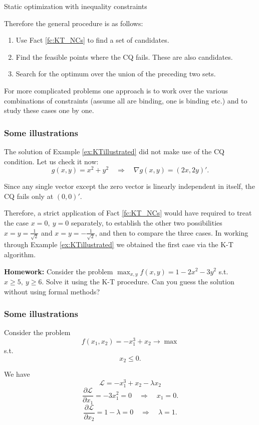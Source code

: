 \documentclass[10pt]{beamer}
\theoremstyle{definition}
\begin{document}
\begin{section}{Static optimization with inequality constraints}
\begin{frame}[fragile]
Therefore the general procedure is as follows:
\begin{enumerate}
\item Use Fact \ref{fc:KT_NCs} to find a set of candidates.
\item Find the feasible points where the CQ fails. These are also candidates.
\item Search for the optimum over the union of the preceding two sets.
\end{enumerate}\bigskip

For more complicated problems one approach is to work over the various combinations of constraints (assume all are binding, one is binding etc.) and to study these cases one by one.
\end{frame}

\begin{frame}[fragile]
\frametitle{Some illustrations}
\begin{example}
The solution of Example \ref{ex:KTillustrated} did not make use of the CQ condition. Let us check it now: \[ g(x,y)=x^2+y^2 \quad \Rightarrow \quad \nabla g(x,y) = (2x,2y)'. \]

Since any single vector except the zero vector is linearly independent in itself, the CQ fails only at $ (0,0)' $.

Therefore, a strict application of Fact \ref{fc:KT_NCs} would have required to treat the case $ x=0,~y=0 $ separately, to establish the other two possibilities $ x=y=\frac{1}{\sqrt{2}} $ and $ x=y=-\frac{1}{\sqrt{2}} $, and then to compare the three cases. In working through Example  \ref{ex:KTillustrated} we obtained the first case via the K-T algorithm.
\label{ex:revisitKTillustrated}
\end{example}\bigskip

\textbf{Homework:} Consider the problem $ \max_{x,y} f(x,y)=1-2x^2-3y^2 $ s.t. $ x\geq 5,~y \geq 6 $. Solve it using the K-T procedure. Can you guess the solution without using formal methods?
\end{frame}

\begin{frame}[fragile]
\frametitle{Some illustrations}
\begin{example}
Consider the problem
\[ f(x_1,x_2) = -x_1^3+x_2 \rightarrow \max \]
s.t. \[ x_2\leq 0. \]

We have \[ \mathcal{L} =  -x_1^3+x_2 - \lambda x_2  \]
\[ \dfrac{\partial \mathcal{L}}{\partial x_1} = -3x_1^2 = 0 \quad \Rightarrow \quad x_1 = 0. \]
\[ \dfrac{\partial \mathcal{L}}{\partial x_2} = 1-\lambda = 0 \quad \Rightarrow \quad \lambda = 1. \]


\end{example}
\end{frame}
\end{section}
\end{document}
